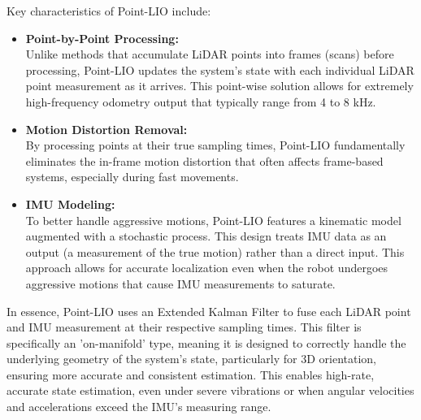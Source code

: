             Key characteristics of \ac{Point-LIO} include:
            \begin{itemize}
                \item \textbf{Point-by-Point Processing: } \\
                    Unlike methods that accumulate LiDAR points into frames (scans) before processing, \ac{Point-LIO} updates the system's state with each individual \ac{LiDAR} point measurement as it arrives. 
                    This point-wise solution allows for extremely high-frequency odometry output that typically range from 4 to 8 kHz.
                \item \textbf{Motion Distortion Removal: } \\ 
                    By processing points at their true sampling times, \ac{Point-LIO} fundamentally eliminates the in-frame motion distortion that often affects frame-based systems, especially during fast movements.
                \item \textbf{IMU Modeling:} \\
                    To better handle aggressive motions, \ac{Point-LIO} features a kinematic model augmented with a stochastic process. 
                    This design treats \ac{IMU} data as an output (a measurement of the true motion) rather than a direct input.
                    This approach allows for accurate localization even when the robot undergoes aggressive motions that cause \ac{IMU} measurements to saturate.
            \end{itemize}
            In essence, \ac{Point-LIO} uses an Extended Kalman Filter to fuse each \ac{LiDAR} point and \ac{IMU} measurement at their respective sampling times. 
            This filter is specifically an 'on-manifold' type, meaning it is designed to correctly handle the underlying geometry of the system's state, particularly for 3D orientation, ensuring more accurate and consistent estimation. 
            This enables high-rate, accurate state estimation, even under severe vibrations or when angular velocities and accelerations exceed the \ac{IMU}'s measuring range.

